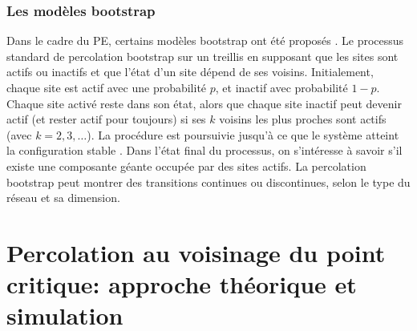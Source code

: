 \subsubsection{Les modèles bootstrap}
Dans le cadre du PE, certains modèles bootstrap ont été proposés \cite{Baxter-al2010}. Le processus standard de percolation bootstrap sur un treillis en supposant que les sites sont actifs ou inactifs et que l'état d'un site dépend de ses voisins. Initialement, chaque site est actif avec une probabilité $p$, et inactif avec probabilité $1-p$. Chaque site activé reste dans son état, alors que chaque site inactif peut devenir actif (et rester actif pour toujours) si ses $k$ voisins les plus proches sont actifs (avec $k=2,3,\ldots$). La procédure est poursuivie jusqu'à ce que le système atteint la configuration stable . Dans l'état final du processus, on s'intéresse à savoir s'il existe  une composante géante occupée par des sites actifs. La percolation bootstrap peut montrer des transitions continues ou discontinues, selon le type du réseau et sa dimension.
\begin{sloppypar}
	
\section{Percolation au voisinage du point critique: approche théorique et simulation}
\end{sloppypar}
